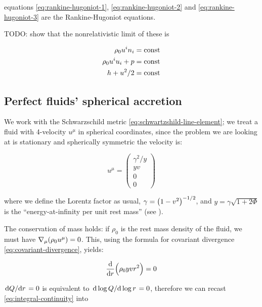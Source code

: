 \documentclass[main.tex]{subfiles}
\begin{document}
equations \eqref{eq:rankine-hugoniot-1}, \eqref{eq:rankine-hugoniot-2} and \eqref{eq:rankine-hugoniot-3} are the Rankine-Hugoniot equations.

\begin{greenbox}
  TODO: show that the nonrelativistic limit of these is

  \begin{subequations}
  \begin{align}
    \rho_0 u^i n_i &= \operatorname{const}  \\
    \rho_0 u^i u_i + p &= \operatorname{const}  \\
    h + u^2 /2 &= \operatorname{const}
  \end{align}
  \end{subequations}
\end{greenbox}

\subsection{Perfect fluids' spherical accretion}

We work with the Schwarzschild metric \eqref{eq:schwartzshild-line-element}; we treat a fluid with 4-velocity $u^\mu$ in spherical coordinates, since the problem we are looking at is stationary and spherically symmetric the velocity is:

\begin{equation}
    u^\mu = \begin{pmatrix}
        \gamma^2 / y\\
        yv\\
        0\\
        0
    \end{pmatrix}
\end{equation}

where we define the Lorentz factor as usual, $\gamma = \qty(1-v^2)^{-1/2}$, and $y=\gamma \sqrt{1+2\Phi}$ is the ``energy-at-infinity per unit rest mass'' (see \cite[equation 3]{ThorneFLammmangZytkow:1981feb}).

The conservation of mass holds: if $\rho_0$ is the rest mass density of the fluid, we must have $\nabla_\mu \qty(\rho_0 u^\mu) =0$. This, using the formula for covariant divergence \eqref{eq:covariant-divergence}, yields:

\begin{equation} \label{eq:integral-continuity}
    \dv{}{r} \qty(\rho_0 yvr^2) = 0
\end{equation}

\(\dv*{Q}{r} = 0\) is equivalent to \(\dv*{\log Q }{\log r} = 0 \), therefore we can recast \eqref{eq:integral-continuity} into
\end{document}
